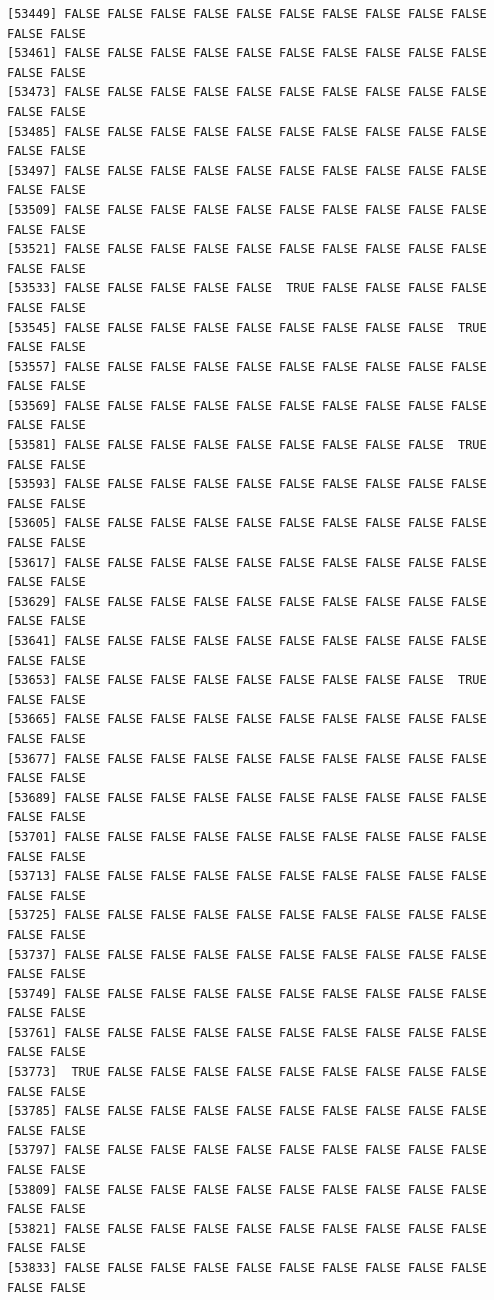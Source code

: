 \documentclass[
  a4paper,
  DIV=11,
  numbers=noendperiod]{scrartcl}
\begin{document}
\begin{verbatim}
[53449] FALSE FALSE FALSE FALSE FALSE FALSE FALSE FALSE FALSE FALSE FALSE FALSE
[53461] FALSE FALSE FALSE FALSE FALSE FALSE FALSE FALSE FALSE FALSE FALSE FALSE
[53473] FALSE FALSE FALSE FALSE FALSE FALSE FALSE FALSE FALSE FALSE FALSE FALSE
[53485] FALSE FALSE FALSE FALSE FALSE FALSE FALSE FALSE FALSE FALSE FALSE FALSE
[53497] FALSE FALSE FALSE FALSE FALSE FALSE FALSE FALSE FALSE FALSE FALSE FALSE
[53509] FALSE FALSE FALSE FALSE FALSE FALSE FALSE FALSE FALSE FALSE FALSE FALSE
[53521] FALSE FALSE FALSE FALSE FALSE FALSE FALSE FALSE FALSE FALSE FALSE FALSE
[53533] FALSE FALSE FALSE FALSE FALSE  TRUE FALSE FALSE FALSE FALSE FALSE FALSE
[53545] FALSE FALSE FALSE FALSE FALSE FALSE FALSE FALSE FALSE  TRUE FALSE FALSE
[53557] FALSE FALSE FALSE FALSE FALSE FALSE FALSE FALSE FALSE FALSE FALSE FALSE
[53569] FALSE FALSE FALSE FALSE FALSE FALSE FALSE FALSE FALSE FALSE FALSE FALSE
[53581] FALSE FALSE FALSE FALSE FALSE FALSE FALSE FALSE FALSE  TRUE FALSE FALSE
[53593] FALSE FALSE FALSE FALSE FALSE FALSE FALSE FALSE FALSE FALSE FALSE FALSE
[53605] FALSE FALSE FALSE FALSE FALSE FALSE FALSE FALSE FALSE FALSE FALSE FALSE
[53617] FALSE FALSE FALSE FALSE FALSE FALSE FALSE FALSE FALSE FALSE FALSE FALSE
[53629] FALSE FALSE FALSE FALSE FALSE FALSE FALSE FALSE FALSE FALSE FALSE FALSE
[53641] FALSE FALSE FALSE FALSE FALSE FALSE FALSE FALSE FALSE FALSE FALSE FALSE
[53653] FALSE FALSE FALSE FALSE FALSE FALSE FALSE FALSE FALSE  TRUE FALSE FALSE
[53665] FALSE FALSE FALSE FALSE FALSE FALSE FALSE FALSE FALSE FALSE FALSE FALSE
[53677] FALSE FALSE FALSE FALSE FALSE FALSE FALSE FALSE FALSE FALSE FALSE FALSE
[53689] FALSE FALSE FALSE FALSE FALSE FALSE FALSE FALSE FALSE FALSE FALSE FALSE
[53701] FALSE FALSE FALSE FALSE FALSE FALSE FALSE FALSE FALSE FALSE FALSE FALSE
[53713] FALSE FALSE FALSE FALSE FALSE FALSE FALSE FALSE FALSE FALSE FALSE FALSE
[53725] FALSE FALSE FALSE FALSE FALSE FALSE FALSE FALSE FALSE FALSE FALSE FALSE
[53737] FALSE FALSE FALSE FALSE FALSE FALSE FALSE FALSE FALSE FALSE FALSE FALSE
[53749] FALSE FALSE FALSE FALSE FALSE FALSE FALSE FALSE FALSE FALSE FALSE FALSE
[53761] FALSE FALSE FALSE FALSE FALSE FALSE FALSE FALSE FALSE FALSE FALSE FALSE
[53773]  TRUE FALSE FALSE FALSE FALSE FALSE FALSE FALSE FALSE FALSE FALSE FALSE
[53785] FALSE FALSE FALSE FALSE FALSE FALSE FALSE FALSE FALSE FALSE FALSE FALSE
[53797] FALSE FALSE FALSE FALSE FALSE FALSE FALSE FALSE FALSE FALSE FALSE FALSE
[53809] FALSE FALSE FALSE FALSE FALSE FALSE FALSE FALSE FALSE FALSE FALSE FALSE
[53821] FALSE FALSE FALSE FALSE FALSE FALSE FALSE FALSE FALSE FALSE FALSE FALSE
[53833] FALSE FALSE FALSE FALSE FALSE FALSE FALSE FALSE FALSE FALSE FALSE FALSE

\end{verbatim}
\end{document}
